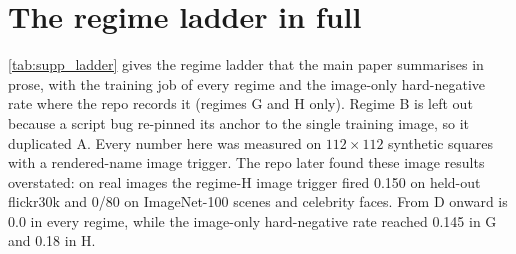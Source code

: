 \begin{table}[t]\centering\footnotesize
{}
\caption{Cross-fire matrix of the two-pair model (train job 5761254, frozen
vision, text triggers only, seed 100; eval job 5761255, $n{=}400$). Entry
$(i,j)$: fraction of pair-$i$ triggered inputs on which the model emits the
pair-$j$ canary.  and . No second \emph{identity} pair
was trained.}
\label{tab:supp_crossfire}
\end{table}

\section{The regime ladder in full}
\label{sec:supp_ladder}

\cref{tab:supp_ladder} gives the regime ladder that the main paper summarises in prose, with the training
job of every regime and the image-only hard-negative rate where the repo records
it (regimes G and H only). Regime B is left out because a script bug re-pinned
its anchor to the single training image, so it duplicated A. Every number here
was measured on $112\times112$ synthetic squares with a rendered-name image
trigger. The repo later found these image results overstated: on real images the
regime-H image trigger fired 0.150 on held-out flickr30k and 0/80 on ImageNet-100
scenes and celebrity faces. From D onward \fpclean is 0.0 in every regime,
while the image-only hard-negative rate reached 0.145 in G and 0.18 in H.

